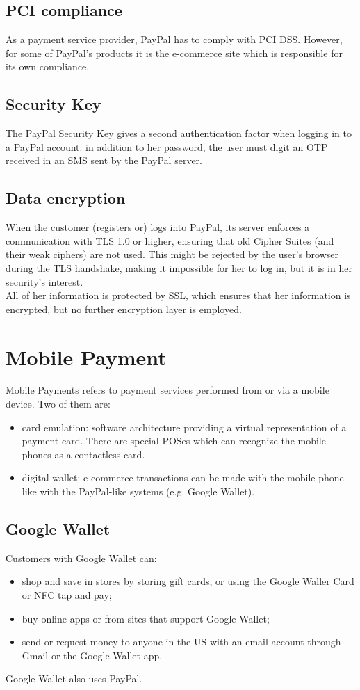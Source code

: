 \documentclass[a4paper, 10pt, titlepage]{article}
\begin{document}
\subsection{PCI compliance}
As a payment service provider, PayPal has to comply with PCI DSS. However, for some of PayPal's products it is the e-commerce site which is responsible for its own compliance.

\subsection{Security Key}
The PayPal Security Key gives a second authentication factor when logging in to a PayPal account: in addition to her password, the user must digit an OTP received in an SMS sent by the PayPal server.

\subsection{Data encryption}
When the customer (registers or) logs into PayPal, its server enforces a communication with TLS 1.0 or higher, ensuring that old Cipher Suites (and their weak ciphers) are not used. This might be rejected by the user's browser during the TLS handshake, making it impossible for her to log in, but it is in her security's interest.\\
All of her information is protected by SSL, which ensures that her information is encrypted, but no further encryption layer is employed.

\section{Mobile Payment}
Mobile Payments refers to payment services performed from or via a mobile device. Two of them are:
\begin{itemize}
\item card emulation: software architecture providing a virtual representation of a payment card. There are special POSes which can recognize the mobile phones as a contactless card.
\item digital wallet: e-commerce transactions can be made with the mobile phone like with the PayPal-like systems (e.g. Google Wallet).
\end{itemize}

\subsection{Google Wallet}
Customers with Google Wallet can:
\begin{itemize}
\item shop and save in stores by storing gift cards, or using the Google Waller Card or NFC tap and pay;
\item buy online apps or from sites that support Google Wallet;
\item send or request money to anyone in the US	with an email account through Gmail or the Google Wallet app.
\end{itemize}
Google Wallet also uses PayPal.
\end{document}
